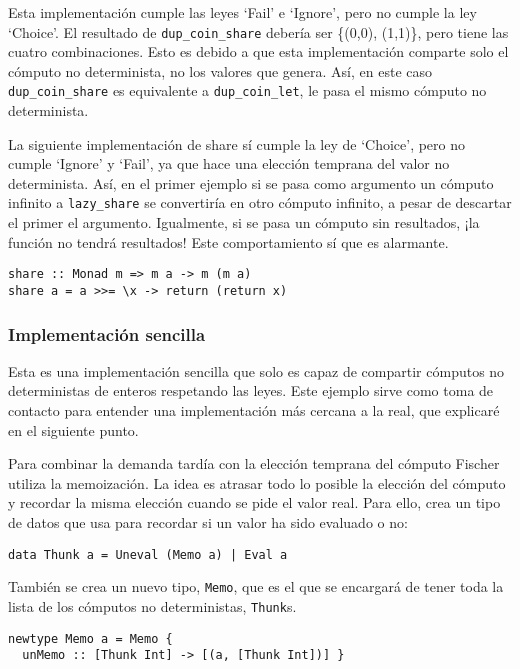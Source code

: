 \documentclass[class=article, crop=false]{standalone}
\begin{document}
Esta implementación cumple las leyes `Fail' e `Ignore', pero no cumple la ley `Choice'. El
resultado de \verb`dup_coin_share` debería ser \{(0,0), (1,1)\}, pero tiene las cuatro
combinaciones. Esto es debido a que esta implementación comparte solo el cómputo no
determinista, no los valores que genera. Así, en este caso \verb`dup_coin_share` es
equivalente a \verb`dup_coin_let`, le pasa el mismo cómputo no determinista.

La siguiente implementación de share sí cumple la ley de `Choice', pero no cumple `Ignore' y
`Fail', ya que hace una elección temprana del valor no determinista. Así, en el primer
ejemplo si se pasa como argumento un cómputo infinito a \verb`lazy_share` se convertiría en
otro cómputo infinito, a pesar de descartar el primer el argumento. Igualmente, si se pasa un
cómputo sin resultados, ¡la función no tendrá resultados! Este comportamiento sí que es
alarmante.

\begin{verbatim} 
share :: Monad m => m a -> m (m a)
share a = a >>= \x -> return (return x)
\end{verbatim}

\subsubsection{Implementación sencilla}
Esta es una implementación sencilla que solo es capaz de compartir cómputos no deterministas
de enteros respetando las leyes. Este ejemplo sirve como toma de contacto para entender una
implementación más cercana a la real, que explicaré en el siguiente punto.

Para combinar la demanda tardía con la elección temprana del cómputo Fischer utiliza la
memoización. La idea es atrasar todo lo posible la elección del cómputo y recordar la misma
elección cuando se pide el valor real. Para ello, crea un tipo de datos que usa para recordar
si un valor ha sido evaluado o no:

\begin{verbatim} 
data Thunk a = Uneval (Memo a) | Eval a
\end{verbatim}

También se crea un nuevo tipo, \verb`Memo`, que es el que se encargará de tener toda la lista
de los cómputos no deterministas, \verb`Thunk`s.

\begin{verbatim} 
newtype Memo a = Memo {
  unMemo :: [Thunk Int] -> [(a, [Thunk Int])] }
\end{verbatim}
\end{document}
